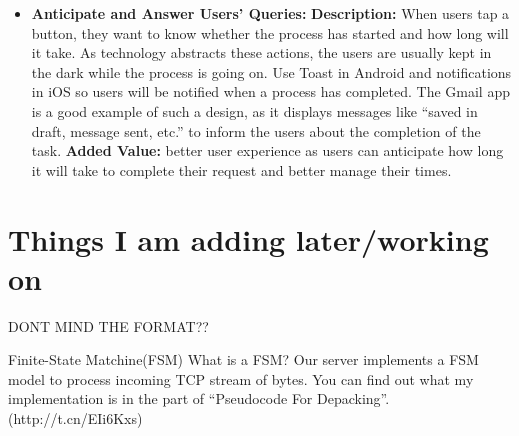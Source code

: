\documentclass{article}
\begin{document}
\begin{itemize}
\item \textbf{Anticipate and Answer Users’ Queries:}
\textbf{Description:} When users tap a button, they want to know whether the process has started and how long will it take. As technology abstracts these actions, the users are usually kept in the dark while the process is going on. Use Toast in Android and notifications in iOS so users will be notified when a process has completed. The Gmail app is a good example of such a design, as it displays messages like “saved in draft, message sent, etc.” to inform the users about the completion of the task.
\textbf{Added Value:} better user experience as users can anticipate how long it will take to complete their request and better manage their times.
\end{itemize}

\section{Things I am adding later/working on}
DONT MIND THE FORMAT??

Finite-State Matchine(FSM)
What is a FSM?
Our server implements a FSM model to process incoming TCP stream of bytes.
You can find out what my implementation is in the part of “Pseudocode For Depacking”. (http://t.cn/EIi6Kxs)

\nocite{*}



\end{document}
